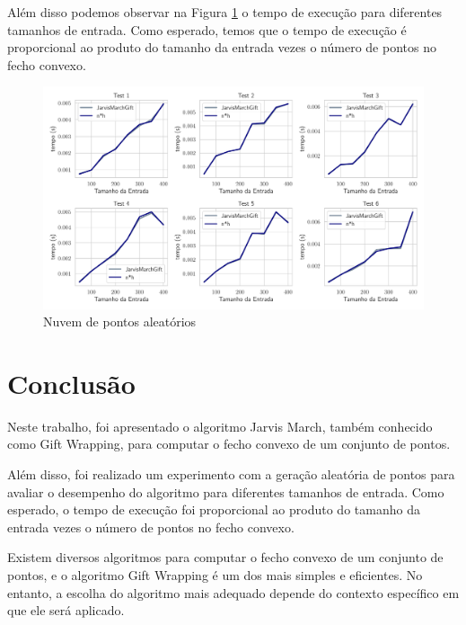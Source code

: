 \documentclass{article}
\begin{document}
Além disso podemos observar na Figura \ref{fig:aleatoria-runtime} o tempo de execução para diferentes tamanhos de entrada. Como esperado, temos que o tempo de execução é proporcional ao produto do tamanho da entrada vezes o número de pontos no fecho convexo.

\begin{figure}[H]
  \centering
  \includegraphics[scale=0.5]{runtime_test.pdf}
  \caption{Nuvem de pontos aleatórios}
  \label{fig:aleatoria-runtime}  
\end{figure}


\section{Conclusão}

Neste trabalho, foi apresentado o algoritmo Jarvis March, também conhecido como Gift Wrapping, para computar o fecho convexo de um conjunto de pontos. 

Além disso, foi realizado um experimento com a geração aleatória de pontos para avaliar o desempenho do algoritmo para diferentes tamanhos de entrada. Como esperado, o tempo de execução foi proporcional ao produto do tamanho da entrada vezes o número de pontos no fecho convexo.

Existem diversos algoritmos para computar o fecho convexo de um conjunto de pontos, e o algoritmo Gift Wrapping é um dos mais simples e eficientes. No entanto, a escolha do algoritmo mais adequado depende do contexto específico em que ele será aplicado.



\end{document}
